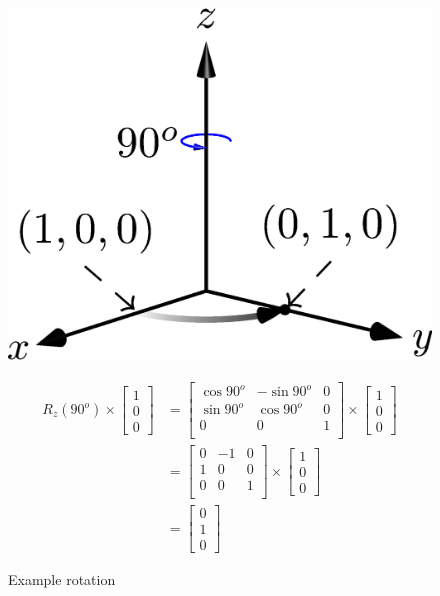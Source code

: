 \begin{figure}
\begin{minipage}{.25\textwidth}
  \includegraphics[]{frames/figs/rot_matrix.png}
  \end{minipage}%
  \begin{minipage}{.75\textwidth}


\begin{align*}
R_z(90^o) \times 
\begin{bmatrix}
1\\
 0\\
 0
\end{bmatrix} &=
\begin{bmatrix}
\cos{90^o} & -\sin{90^o} & 0 \\
\sin{90^o} & \cos{90^o} & 0 \\
0 & 0 & 1 \\
\end{bmatrix}
\times 
\begin{bmatrix}
1\\
 0\\
 0
\end{bmatrix} \\
&=
\begin{bmatrix}
0 & -1 & 0\\
1 & 0 & 0 \\
0 & 0 & 1 \\
\end{bmatrix}\times 
\begin{bmatrix}
1 \\
 0\\
 0
\end{bmatrix}\\
&=
\begin{bmatrix}0\\
 1\\
 0
\end{bmatrix}
\end{align*}
\end{minipage}
\caption{Example rotation}
\label{fig:example_matrix}
\end{figure}



